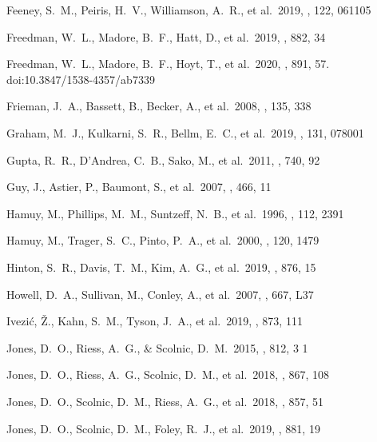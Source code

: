 \documentclass[referee]{aa}
\begin{document}
\begin{thebibliography}{}

 Feeney, S.~M., Peiris, H.~V.,
Williamson, A.~R., et al.\ 2019, \prl, 122, 061105

 Freedman, W.~L., Madore, B.~F.,
Hatt, D., et al.\ 2019, \apj, 882, 34

 Freedman, W.~L., Madore, B.~F.,
Hoyt, T., et al.\ 2020, \apj, 891, 57. doi:10.3847/1538-4357/ab7339

 Frieman, J.~A., Bassett, B., Becker,
A., et al.\ 2008, \aj, 135, 338


 Graham, M.~J., Kulkarni, S.~R., Bellm,
E.~C., et al.\ 2019, \pasp, 131, 078001

 Gupta, R.~R., D'Andrea, C.~B., Sako, M.,
et al.\ 2011, \apj, 740, 92

 Guy, J., Astier, P., Baumont, S., et al.\
2007, \aap, 466, 11


 Hamuy, M., Phillips, M.~M., Suntzeff,
N.~B., et al.\ 1996, \aj, 112, 2391

 Hamuy, M., Trager, S.~C., Pinto, P.~A.,
et al.\ 2000, \aj, 120, 1479

 Hinton, S.~R., Davis, T.~M., Kim,
A.~G., et al.\ 2019, \apj, 876, 15

 Howell, D.~A., Sullivan, M., Conley,
A., et al.\ 2007, \apjl, 667, L37


 Ivezi{\'c}, {\v{Z}}., Kahn, S.~M.,
Tyson, J.~A., et al.\ 2019, \apj, 873, 111


 Jones, D.~O., Riess, A.~G., \& Scolnic,
D.~M.\ 2015, \apj, 812, 3 1

 Jones, D.~O., Riess, A.~G., Scolnic,
D.~M., et al.\ 2018, \apj, 867, 108

 Jones, D.~O., Scolnic, D.~M., Riess,
A.~G., et al.\ 2018, \apj, 857, 51

 Jones, D.~O., Scolnic, D.~M., Foley,
R.~J., et al.\ 2019, \apj, 881, 19


\end{thebibliography}
\end{document}
